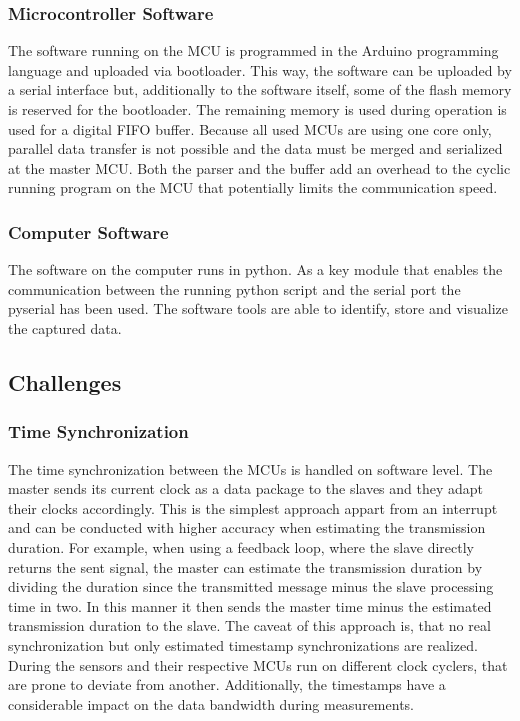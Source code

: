 \subsubsection{Microcontroller Software}
The software running on the \ac{MCU} is programmed in the Arduino programming language and uploaded via bootloader. This way, the software can be uploaded by a serial interface but, additionally to the software itself, some of the flash memory is reserved for the bootloader. The remaining memory is used during operation is used for a digital \ac{FIFO} buffer.
Because all used \ac{MCU}s are using one core only, parallel data transfer is not possible and the data must be merged and serialized at the master \ac{MCU}. Both the parser and the buffer add an overhead to the cyclic running program on the \ac{MCU} that potentially limits the communication speed.

\subsubsection{Computer Software}
The software on the computer runs in python. As a key module that enables the communication between the running python script and the serial port the pyserial has been used. The software tools are able to identify, store and visualize the captured data.

\subsection{Challenges}

\subsubsection{Time Synchronization}
The time synchronization between the \ac{MCU}s is handled on software level. The master sends its current clock as a data package to the slaves and they adapt their clocks accordingly. This is the simplest approach appart from an interrupt and can be conducted with higher accuracy when estimating the transmission duration. For example, when using a feedback loop, where the slave directly returns the sent signal, the master can estimate the transmission duration by dividing the duration since the transmitted message minus the slave processing time in two. In this manner it then sends the master time minus the estimated transmission duration to the slave. The caveat of this approach is, that no real synchronization but only estimated timestamp synchronizations are realized. During the sensors and their respective \ac{MCU}s run on different clock cyclers, that are prone to deviate from another. Additionally, the timestamps have a considerable impact on the data bandwidth during measurements.

